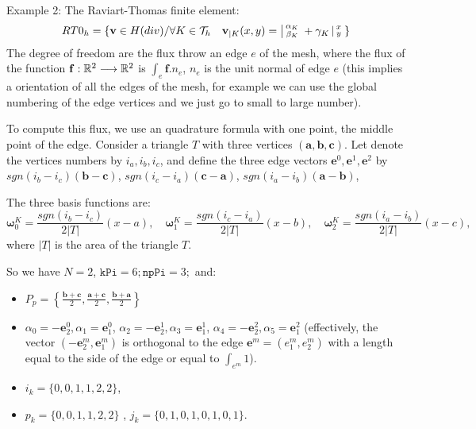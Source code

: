  Example 2: The Raviart-Thomas finite element:
\begin{equation}
         RT0_{h} = \{ \mathbf{v} \in H(div) / \forall K \in
         \mathcal{T}_{h} \quad  \mathbf{v}_{|K}(x,y) =
         \left|\begin{smallmatrix} \alpha_{K} \\ \beta_{K} \end{smallmatrix}\right. + \gamma_{K}\left|\begin{smallmatrix} x \\ y \end{smallmatrix}\right.  \}
         \label{eq:RT0-fe}
\end{equation}
 The degree of freedom are the flux   throw an edge $e$ of the mesh, where the flux of
 the function $\mathbf{f} : \mathbb{R}^2 \longrightarrow \mathbb{R}^2 $ is $\int_{e} \mathbf{f}.n_{e}$,
 $n_{e}$ is the unit normal of edge $e$ (this implies a orientation of all the edges of the mesh,
 for example we can use the global numbering of the edge vertices and we just go to small to large number).


  To compute this flux, we use an quadrature formula with one point, the middle point of the edge. Consider a triangle $T$ with three vertices $(\mathbf{a},\mathbf{b},\mathbf{c})$.
Let denote the  vertices numbers by $i_{a},i_{b},i_{c}$, and define the three edge vectors $\mathbf{e}^{0},\mathbf{e}^{1},\mathbf{e}^{2}$
by $ sgn(i_{b}-i_{c})(\mathbf{b}-\mathbf{c})$, $sgn(i_{c}-i_{a})(\mathbf{c}-\mathbf{a})$, $sgn(i_{a}-i_{b})(\mathbf{a}-\mathbf{b})$,

 The three basis functions are:
\begin{equation}
 \boldsymbol{\omega}^{K}_{0}= \frac{sgn(i_{b}-i_{c})}{2|T|}(x-a),\quad  \boldsymbol{\omega}^{K}_{1}= \frac{sgn(i_{c}-i_{a})}{2|T|}(x-b),\quad  \boldsymbol{\omega}^{K}_{2}= \frac{sgn(i_{a}-i_{b})}{2|T|}(x-c),
\end{equation}
where $|T|$ is the area of the triangle $T$.

So we have  $N=2$, $\mathtt{kPi}=6; \mathtt{npPi}=3;$ and:
\begin{itemize}
\item $
P_{p} = \left\{\frac{\mathbf{b}+\mathbf{c}}{2},
\frac{\mathbf{a}+\mathbf{c}}{2},
\frac{\mathbf{b}+\mathbf{a}}{2} \right\}$

\item
 $\alpha_{0}= - \mathbf{e}^{0}_{2}, \alpha_{1}= \mathbf{e}^{0}_{1}$,
 $\alpha_{2}= - \mathbf{e}^{1}_{2}, \alpha_{3}= \mathbf{e}^{1}_{1}$,
 $\alpha_{4}= - \mathbf{e}^{2}_{2}, \alpha_{5}= \mathbf{e}^{2}_{1}$ (effectively, the vector
 $ ( -\mathbf{e}^{m}_{2}, \mathbf{e}^{m}_{1}) $ is orthogonal to the edge $\mathbf{e}^{m}= (e^m_{1},e^m_{2})$ with
 a length equal to the side of the edge or equal to  $\int_{e^m} 1$).
\item $i_{k}=\{0,0,1,1,2,2\}$,
\item $p_{k}=\{0,0,1,1,2,2\}$ ,  $j_{k}=\{0,1,0,1,0,1,0,1\}$.
\end{itemize}


